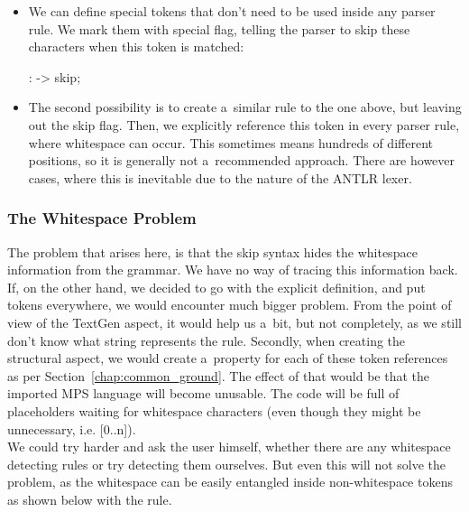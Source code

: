 \begin{itemize}
	\item We can define special tokens that don't need to be used inside any parser rule.
	We mark them with special flag, telling the parser to skip these characters when this token is matched:

	\begin{antlr}
		   :     -> skip;
	\end{antlr}

	\item The second possibility is to create a~similar rule to the one above, but leaving out the skip flag.
	Then, we explicitly reference this token in every parser rule, where whitespace can occur.
	This sometimes means hundreds of different positions, so it is generally not a~recommended approach.
	There are however cases, where this is inevitable due to the nature of the ANTLR lexer.
\end{itemize}

\subsubsection{The Whitespace Problem}

The problem that arises here, is that the skip syntax hides the whitespace information from the grammar.
We have no way of tracing this information back.
If, on the other hand, we decided to go with the explicit definition, and put  tokens everywhere, we would encounter much bigger problem.
From the point of view of the TextGen aspect, it would help us a~bit, but not completely, as we still don't know what string represents the rule.
Secondly, when creating the structural aspect, we would create a~property for each of these token references as per Section~\ref{chap:common_ground}.
The effect of that would be that the imported MPS language will become unusable.
The code will be full of placeholders waiting for whitespace characters (even though they might be unnecessary, i.e. [0..n]).
\\

We could try harder and ask the user himself, whether there are any whitespace detecting rules or try detecting them ourselves.
But even this will not solve the problem, as the whitespace can be easily entangled inside non-whitespace tokens as shown below with the  rule.
\\

